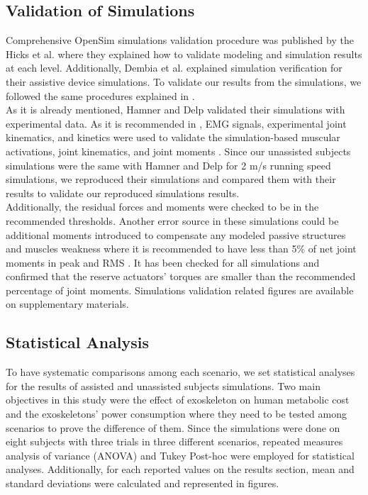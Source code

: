 \documentclass[10pt,letterpaper]{article}
\begin{document}
\subsection*{Validation of Simulations}
Comprehensive OpenSim simulations validation procedure was published by the Hicks et al. \cite{92} where they explained how to validate modeling and simulation results at each level. Additionally, Dembia et al. \cite{93} explained simulation verification for their assistive device simulations. To validate our results from the simulations, we followed the same procedures explained in \cite{93}.\\
As it is already mentioned, Hamner and Delp \cite{101} validated their simulations with experimental data. As it is recommended in \cite{92}, EMG signals, experimental joint kinematics, and kinetics were used to validate the simulation-based muscular activations, joint kinematics, and joint moments \cite{101}. Since our unassisted subjects simulations were the same with Hamner and Delp \cite{101} for 2 m/s running speed simulations, we reproduced their simulations and compared them with their results to validate our reproduced simulations results.\\
Additionally, the residual forces and moments were checked to be in the recommended thresholds\cite{92}. Another error source in these simulations could be additional moments introduced to compensate any modeled passive structures and muscles weakness where it is recommended to have less than 5\% of net joint moments in peak and RMS \cite{92}. It has been checked for all simulations and confirmed that the reserve actuators' torques are smaller than the recommended percentage of joint moments. Simulations validation related figures are available on supplementary materials.
\subsection*{Statistical Analysis}
To have systematic comparisons among each scenario, we set statistical analyses for the results of assisted and unassisted subjects simulations. Two main objectives in this study were the effect of exoskeleton on human metabolic cost and the exoskeletons' power consumption where they need to be tested among scenarios to prove the difference of them. Since the simulations were done on eight subjects with three trials in three different scenarios, repeated measures analysis of variance (ANOVA) and Tukey Post-hoc were employed for statistical analyses. Additionally, for each reported values on the results section, mean and standard deviations were calculated and represented in figures.
\end{document}
